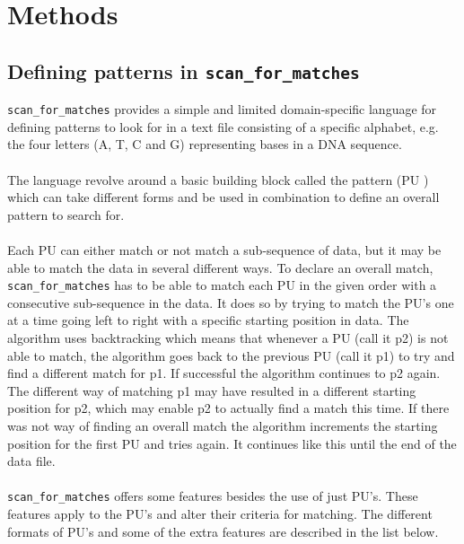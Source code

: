 \documentclass[12pt]{article}
\newcommand{\scm}{\texttt{scan\_for\_matches} }
\newcommand{\pu}{PU }
\newcommand{\pus}{PU's }
\newcommand{\pusp}{PU's. }
\begin{document}
\section{Methods}
\subsection{Defining patterns in \scm}
\scm provides a simple and limited domain-specific language for defining patterns to look for in a text file consisting
of a specific alphabet, e.g. the four letters (A, T, C and G) representing bases in a DNA sequence. \\ \\
The language revolve around a basic building block called the pattern (\pu) which can take different forms
and be used in combination to define an overall pattern to search for. \\ \\
Each \pu can either match or not match a sub-sequence of data, but it may be able to match the data in several different ways.
To declare an overall match, \scm has to be able to match each \pu in the given order with a consecutive sub-sequence in the
data. It does so by trying to match the \pus one at a time going left to right with a specific starting position in data. 
The algorithm uses backtracking which means that whenever a \pu (call it p2) is not able to match, the algorithm goes back to the
previous \pu (call it p1) to try and find a different match for p1. If successful the algorithm continues to p2 again. The
different way of matching p1 may have resulted in a different starting position for p2, which may enable p2 to 
actually find a match this time. If there was not way of finding an overall match the algorithm increments the starting
position for the first \pu and tries again. It continues like this until the end of the data file. \\ \\
\scm offers some features besides the use of just \pusp These features apply to the \pus and alter their criteria
for matching.
The different formats of \pus and some of the extra features are described in the list below.
\end{document}
